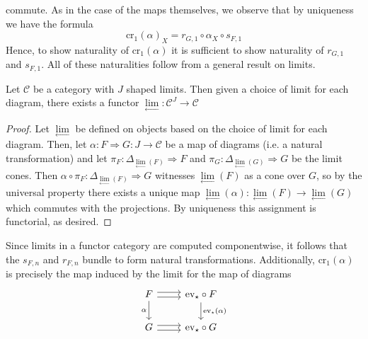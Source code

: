 \noindent commute. As in the case of the maps themselves, we observe that by uniqueness we have the formula 
\begin{equation}\label{eq:natProjFormula1}
    \text{cr}_1(\alpha)_X = r_{G,1}\circ \alpha_X\circ s_{F,1}
\end{equation}
Hence, to show naturality of $\text{cr}_1(\alpha)$ it is sufficient to show naturality of $r_{G,1}$ and $s_{F,1}$. All of these naturalities follow from a general result on limits.
\begin{lem}[label=lem:limFunctor]
    Let $\mathcal{C}$ be a category with $J$ shaped limits. Then given a choice of limit for each diagram, there exists a functor $\lim\limits_{\leftarrow}:\mathcal{C}^J\rightarrow \mathcal{C}$
\end{lem}
\begin{proof}
    Let $\lim\limits_{\leftarrow}$ be defined on objects based on the choice of limit for each diagram. Then, let $\alpha:F\Rightarrow G:J\rightarrow \mathcal{C}$ be a map of diagrams (i.e. a natural transformation) and let $\pi_F:\Delta_{\lim\limits_{\leftarrow}(F)}\Rightarrow F$ and $\pi_G:\Delta_{\lim\limits_{\leftarrow}(G)}\Rightarrow G$ be the limit cones. Then $\alpha\circ \pi_F:\Delta_{\lim\limits_{\leftarrow}(F)}\Rightarrow G$ witnesses $\lim\limits_{\leftarrow}(F)$ as a cone over $G$, so by the universal property there exists a unique map $\lim\limits_{\leftarrow}(\alpha):\lim\limits_{\leftarrow}(F)\rightarrow \lim\limits_{\leftarrow}(G)$ which commutes with the projections. By uniqueness this assignment is functorial, as desired.
\end{proof}
Since limits in a functor category are computed componentwise, it follows that the $s_{F,n}$ and $r_{F,n}$ bundle to form natural transformations. Additionally, $\text{cr}_1(\alpha)$ is precisely the map induced by the limit for the map of diagrams
\[\begin{tikzcd}
	F & {\text{ev}_\star\circ F} \\
	G & {\text{ev}_\star\circ G}
	\arrow[shift left, from=1-1, to=1-2]
	\arrow[shift right, from=1-1, to=1-2]
	\arrow["\alpha"', from=1-1, to=2-1]
	\arrow[shift left, from=2-1, to=2-2]
	\arrow[shift right, from=2-1, to=2-2]
	\arrow["{\text{ev}_\star(\alpha)}", from=1-2, to=2-2]
\end{tikzcd}\]




